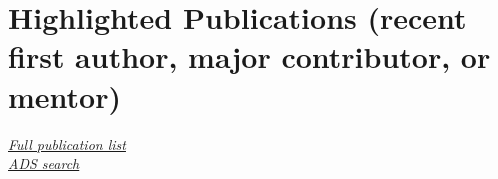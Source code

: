 \documentclass[12pt, letterpaper]{apw-cv}
\begin{document}


\section*{Highlighted Publications (recent first author, major contributor, or mentor)}
\vspace{-1em}

\href{https://adrian.pw/cv/PriceWhelan-pubs.pdf}{{\it Full publication list} \faLink}\\
\href{\adsurl}{{\it ADS search} \faLink}



    \begin{itemize}
        
    \end{itemize}


%         

%         
\end{document}
